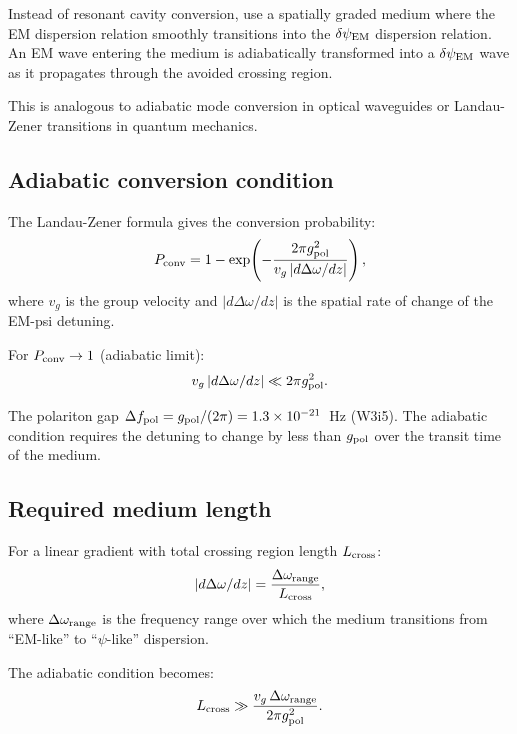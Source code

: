 \documentclass[11pt]{article}
\newcommand{\ee}[1]{\times 10^{#1}}
\newcommand{\dpsiEM}{\delta\psi_{\rm EM}}
\begin{document}
Instead of resonant cavity conversion, use a spatially graded medium
where the EM dispersion relation smoothly transitions into the
$\dpsiEM$ dispersion relation. An EM wave entering the medium is
adiabatically transformed into a $\dpsiEM$ wave as it propagates
through the avoided crossing region.

This is analogous to adiabatic mode conversion in optical waveguides
or Landau-Zener transitions in quantum mechanics.

\subsection{Adiabatic conversion condition}

The Landau-Zener formula gives the conversion probability:
\begin{equation}
P_{\rm conv} = 1 - \exp\!\left(-\frac{2\pi g_{\rm pol}^2}{v_g\,|d\Delta\omega/dz|}\right),
\label{eq:Landau-Zener}
\end{equation}
where $v_g$ is the group velocity and $|d\Delta\omega/dz|$ is the
spatial rate of change of the EM-psi detuning.

For $P_{\rm conv} \to 1$ (adiabatic limit):
\begin{equation}
v_g\,|d\Delta\omega/dz| \ll 2\pi g_{\rm pol}^2.
\label{eq:adiabatic-condition}
\end{equation}

The polariton gap $\Delta f_{\rm pol} = g_{\rm pol}/(2\pi) =
1.3\ee{-21}$~Hz (W3i5). The adiabatic condition requires the
detuning to change by less than $g_{\rm pol}$ over the transit time
of the medium.

\subsection{Required medium length}

For a linear gradient with total crossing region length $L_{\rm cross}$:
\begin{equation}
|d\Delta\omega/dz| = \frac{\Delta\omega_{\rm range}}{L_{\rm cross}},
\end{equation}
where $\Delta\omega_{\rm range}$ is the frequency range over which
the medium transitions from ``EM-like'' to ``$\psi$-like'' dispersion.

The adiabatic condition becomes:
\begin{equation}
L_{\rm cross} \gg \frac{v_g\,\Delta\omega_{\rm range}}{2\pi g_{\rm pol}^2}.
\end{equation}
\end{document}
